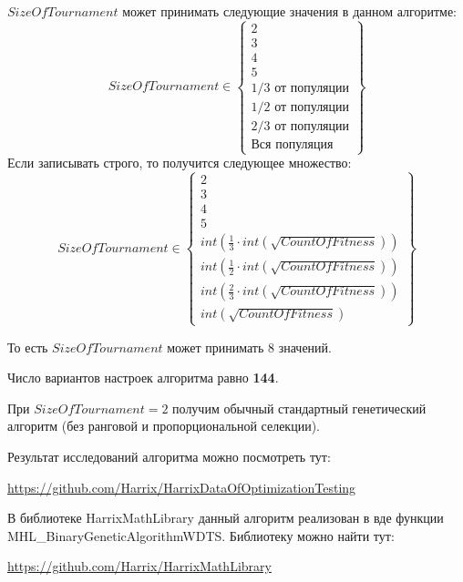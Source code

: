 $SizeOfTournament$ может принимать следующие значения в данном алгоритме:
\begin{equation}
SizeOfTournament \in \begin{Bmatrix}
2\\ 
3\\ 
4\\ 
5\\ 
1/3\text{ от популяции}\\ 
1/2\text{ от популяции}\\ 
2/3\text{ от популяции}\\ 
\text{Вся популяция} 
\end{Bmatrix}
\end{equation}
Если записывать строго, то получится следующее множество:
\begin{equation}
SizeOfTournament \in \begin{Bmatrix}
2\\ 
3\\ 
4\\ 
5\\ 
int\left( \frac{1}{3}\cdot int\left( \sqrt{CountOfFitness}\right)\right)  \\ 
int\left( \frac{1}{2}\cdot int\left( \sqrt{CountOfFitness}\right)\right)\\ 
int\left( \frac{2}{3}\cdot int\left( \sqrt{CountOfFitness}\right)\right)\\ 
int\left( \sqrt{CountOfFitness}\right)
\end{Bmatrix}
\end{equation}

То есть $SizeOfTournament$ может принимать $ 8 $ значений.

Число вариантов настроек алгоритма равно \textbf{144}.

При $ SizeOfTournament=2 $ получим обычный стандартный генетический алгоритм (без ранговой и пропорциональной селекции).

Результат исследований алгоритма можно посмотреть тут:

\href{https://github.com/Harrix/HarrixDataOfOptimizationTesting}{https://github.com/Harrix/HarrixDataOfOptimizationTesting}

В библиотеке HarrixMathLibrary данный алгоритм реализован в вде функции MHL\_BinaryGeneticAlgorithmWDTS. Библиотеку можно найти тут:

\href{https://github.com/Harrix/HarrixMathLibrary}{https://github.com/Harrix/HarrixMathLibrary}